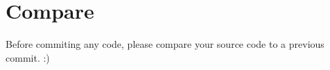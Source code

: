 \clearpage
\section{Compare}
Before commiting any code, please compare your source code to a previous commit. :)
